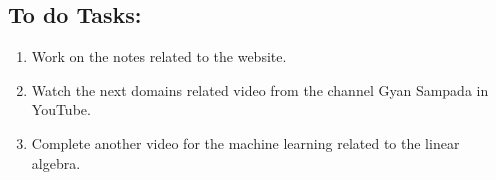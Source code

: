 \subsection*{To do Tasks:}
\begin{enumerate}
    \item Work on the notes related to the website. \cmark
    \item Watch the next domains related video from the channel Gyan Sampada in YouTube.
    \item Complete another video for the machine learning related to the linear algebra.
\end{enumerate}
\stardivider

